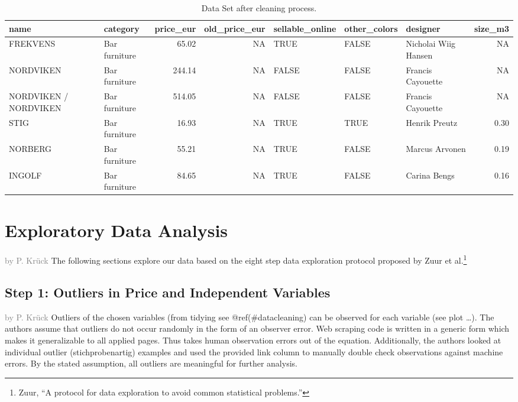 \documentclass[a4paper, nobind]{templates/ociamthesis}
\begin{document}
\begin{table}

\caption{\label{tab:tidy-ikea}Data Set after cleaning process.}
\centering
\begin{tabular}[t]{l|l|r|r|l|l|l|r}
\hline
name & category & price\_eur & old\_price\_eur & sellable\_online & other\_colors & designer & size\_m3\\
\hline
FREKVENS & Bar furniture & 65.02 & NA & TRUE & FALSE & Nicholai Wiig Hansen & NA\\
\hline
NORDVIKEN & Bar furniture & 244.14 & NA & FALSE & FALSE & Francis Cayouette & NA\\
\hline
NORDVIKEN / NORDVIKEN & Bar furniture & 514.05 & NA & FALSE & FALSE & Francis Cayouette & NA\\
\hline
STIG & Bar furniture & 16.93 & NA & TRUE & TRUE & Henrik Preutz & 0.30\\
\hline
NORBERG & Bar furniture & 55.21 & NA & TRUE & FALSE & Marcus Arvonen & 0.19\\
\hline
INGOLF & Bar furniture & 84.65 & NA & TRUE & FALSE & Carina Bengs & 0.16\\
\hline
\end{tabular}
\end{table}

\hypertarget{tbd}{%
\section{Exploratory Data Analysis}\label{tbd}}

\textcolor{gray}{by P. Krück}
The following sections explore our data based on the eight step data exploration protocol proposed by Zuur et al.\footnote{Zuur, ``A protocol for data exploration to avoid common statistical problems.''}

\hypertarget{step-1-outliers-in-price-and-independent-variables}{%
\subsection{Step 1: Outliers in Price and Independent Variables}\label{step-1-outliers-in-price-and-independent-variables}}

\textcolor{gray}{by P. Krück}
Outliers of the chosen variables (from tidying see @ref(\#datacleaning) can be observed for each variable (see plot \ldots{}).
The authors assume that outliers do not occur randomly in the form of an observer error. Web scraping code is written in a generic form which makes it generalizable to all applied pages. Thus takes human observation errors out of the equation. Additionally, the authors looked at individual outlier (stichprobenartig) examples and used the provided link column to manually double check observations against machine errors.
By the stated assumption, all outliers are meaningful for further analysis.
\end{document}
